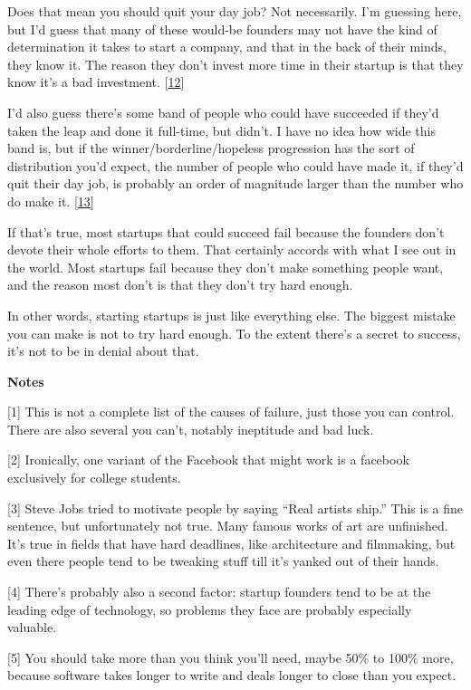 Does that mean you should quit your day job? Not necessarily. I'm
guessing here, but I'd guess that many of these would-be founders may
not have the kind of determination it takes to start a company, and that
in the back of their minds, they know it. The reason they don't invest
more time in their startup is that they know it's a bad investment.
{[}\hyperref[f12n]{12}{]}

I'd also guess there's some band of people who could have succeeded if
they'd taken the leap and done it full-time, but didn't. I have no idea
how wide this band is, but if the winner/borderline/hopeless progression
has the sort of distribution you'd expect, the number of people who
could have made it, if they'd quit their day job, is probably an order
of magnitude larger than the number who do make it.
{[}\hyperref[f13n]{13}{]}

If that's true, most startups that could succeed fail because the
founders don't devote their whole efforts to them. That certainly
accords with what I see out in the world. Most startups fail because
they don't make something people want, and the reason most don't is that
they don't try hard enough.

In other words, starting startups is just like everything else. The
biggest mistake you can make is not to try hard enough. To the extent
there's a secret to success, it's not to be in denial about that.

\textbf{Notes}

{[}1{]} This is not a complete list of the causes of failure, just those
you can control. There are also several you can't, notably ineptitude
and bad luck.

{[}2{]} Ironically, one variant of the Facebook that might work is a
facebook exclusively for college students.

{[}3{]} Steve Jobs tried to motivate people by saying ``Real artists
ship.'' This is a fine sentence, but unfortunately not true. Many famous
works of art are unfinished. It's true in fields that have hard
deadlines, like architecture and filmmaking, but even there people tend
to be tweaking stuff till it's yanked out of their hands.

{[}4{]} There's probably also a second factor: startup founders tend to
be at the leading edge of technology, so problems they face are probably
especially valuable.

{[}5{]} You should take more than you think you'll need, maybe 50\% to
100\% more, because software takes longer to write and deals longer to
close than you expect.

